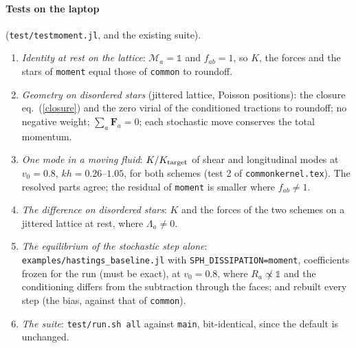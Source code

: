 \documentclass[11pt,aps,preprint,nofootinbib,superscriptaddress,tightenlines]{revtex4-2}
\newcommand{\one}{\mathds{1}}
\def\Eq#1{eq.~(\ref{#1})}
\let\oldparagraph\paragraph
\renewcommand{\paragraph}{\par\bigskip\oldparagraph}
\begin{document}
\paragraph{Tests on the laptop} (\texttt{test/testmoment.jl}, and the existing suite).
\begin{enumerate}
\item \emph{Identity at rest on the lattice}: $\mathcal M_a=\one$ and $f_{ab}=1$, so $K$, the forces and the stars of \texttt{moment} equal those of \texttt{common} to
  roundoff.
\item \emph{Geometry on disordered stars} (jittered lattice, Poisson positions): the closure \Eq{closure} and the zero virial of the conditioned
  tractions to roundoff; no negative weight; $\sum_a\bm F_a=0$; each stochastic move conserves the total momentum.
\item \emph{One mode in a moving fluid}: $K/K_{\rm target}$ of shear and longitudinal modes at $v_0=0.8$, $kh=0.26$--$1.05$, for both schemes (test 2
  of \texttt{commonkernel.tex}).  The resolved parts agree; the residual of \texttt{moment} is smaller where $f_{ab}\neq1$.
\item \emph{The difference on disordered stars}: $K$ and the forces of the two schemes on a jittered lattice at rest, where $\Lambda_a\neq0$.
\item \emph{The equilibrium of the stochastic step alone}: \texttt{examples/hastings\_baseline.jl} with \texttt{SPH\_DISSIPATION=moment}, coefficients frozen for
  the run (must be exact), at $v_0=0.8$, where $R_a\not\propto\one$ and the conditioning differs from the subtraction through the faces; and
  rebuilt every step (the bias, against that of \texttt{common}).
\item \emph{The suite}: \texttt{test/run.sh all} against \texttt{main}, bit-identical, since the default is unchanged.
\end{enumerate}
\end{document}

